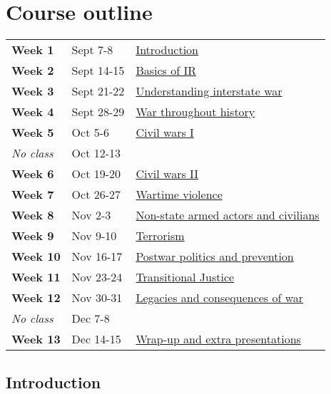 \documentclass[12pt, a4paper]{article}
\begin{document}
\newpage
\section{Course outline}

\begin{table*}[!ht]
  \centering

  \begin{tabular}{lll}
    \textbf{Week 1} & Sept 7-8   & \hyperref[intro]{Introduction} \\
    \textbf{Week 2} & Sept 14-15 & \hyperref[ir_basics]{Basics of IR} \\
    \textbf{Week 3} & Sept 21-22 & \hyperref[interstate]{Understanding interstate war} \\
    \textbf{Week 4} & Sept 28-29 & \hyperref[war_history]{War throughout history} \\
    \textbf{Week 5} & Oct 5-6    & \hyperref[cw1]{Civil wars I} \\
    \textit{No class} & Oct 12-13  &\\
    \textbf{Week 6} & Oct 19-20  & \hyperref[cw2]{Civil wars II} \\
    \textbf{Week 7} & Oct 26-27  & \hyperref[]{Wartime violence} \\
    \textbf{Week 8} & Nov 2-3    & \hyperref[wartime_violence]{Non-state armed actors and civilians} \\
    \textbf{Week 9} & Nov 9-10   & \hyperref[rebels]{Terrorism} \\
    \textbf{Week 10} & Nov 16-17  & \hyperref[terrorism]{Postwar politics and prevention}  \\
    \textbf{Week 11} & Nov 23-24  & \hyperref[postwar]{Transitional Justice} \\
    \textbf{Week 12} & Nov 30-31  & \hyperref[tj]{Legacies and consequences of war} \\
    \textit{No class} & Dec 7-8    &\\
    \textbf{Week 13} & Dec 14-15  & \hyperref[wrap_up]{Wrap-up and extra presentations} \\
  \end{tabular}
\end{table*}




\hline %

\subsection{Introduction} \label{intro}
\end{document}
